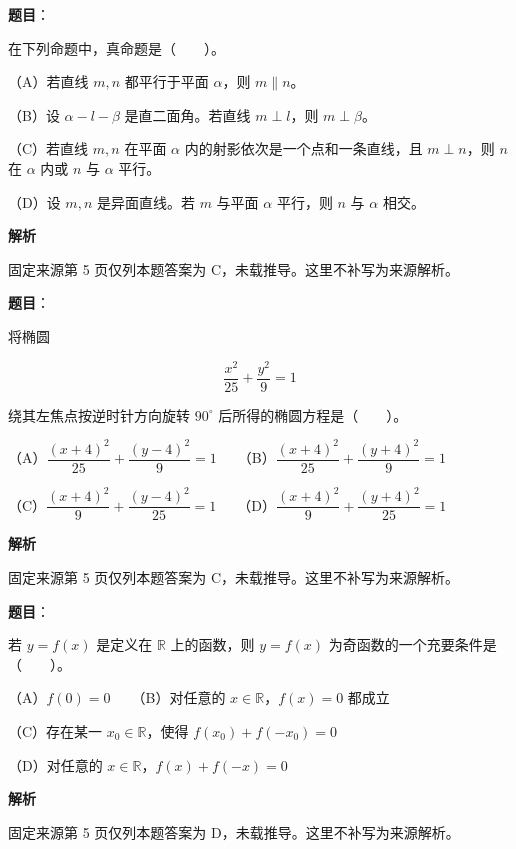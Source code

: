 \begin{answer}

\textbf{题目}：

在下列命题中，真命题是\mbox{（　　）}。

（A）若直线 $m,n$ 都平行于平面 $\alpha$，则 $m\parallel n$。

（B）设 $\alpha-l-\beta$ 是直二面角。若直线 $m\perp l$，则 $m\perp\beta$。

（C）若直线 $m,n$ 在平面 $\alpha$ 内的射影依次是一个点和一条直线，且 $m\perp n$，则 $n$ 在 $\alpha$ 内或 $n$ 与 $\alpha$ 平行。

（D）设 $m,n$ 是异面直线。若 $m$ 与平面 $\alpha$ 平行，则 $n$ 与 $\alpha$ 相交。

\textbf{解析}

固定来源第 5 页仅列本题答案为 C，未载推导。这里不补写为来源解析。


\end{answer}
\begin{answer}

\textbf{题目}：

将椭圆

\nopagebreak[4]
\[
\dfrac{x^2}{25}+\dfrac{y^2}{9}=1
\]

绕其左焦点按逆时针方向旋转 $90^\circ$ 后所得的椭圆方程是\mbox{（　　）}。

（A）$\dfrac{(x+4)^2}{25}+\dfrac{(y-4)^2}{9}=1$　　（B）$\dfrac{(x+4)^2}{25}+\dfrac{(y+4)^2}{9}=1$

（C）$\dfrac{(x+4)^2}{9}+\dfrac{(y-4)^2}{25}=1$　　（D）$\dfrac{(x+4)^2}{9}+\dfrac{(y+4)^2}{25}=1$

\textbf{解析}

固定来源第 5 页仅列本题答案为 C，未载推导。这里不补写为来源解析。


\end{answer}
\begin{answer}

\textbf{题目}：

若 $y=f(x)$ 是定义在 $\mathbb R$ 上的函数，则 $y=f(x)$ 为奇函数的一个充要条件是\mbox{（　　）}。

（A）$f(0)=0$　　（B）对任意的 $x\in\mathbb R$，$f(x)=0$ 都成立

（C）存在某一 $x_0\in\mathbb R$，使得 $f(x_0)+f(-x_0)=0$

（D）对任意的 $x\in\mathbb R$，$f(x)+f(-x)=0$

\textbf{解析}

固定来源第 5 页仅列本题答案为 D，未载推导。这里不补写为来源解析。


\end{answer}

